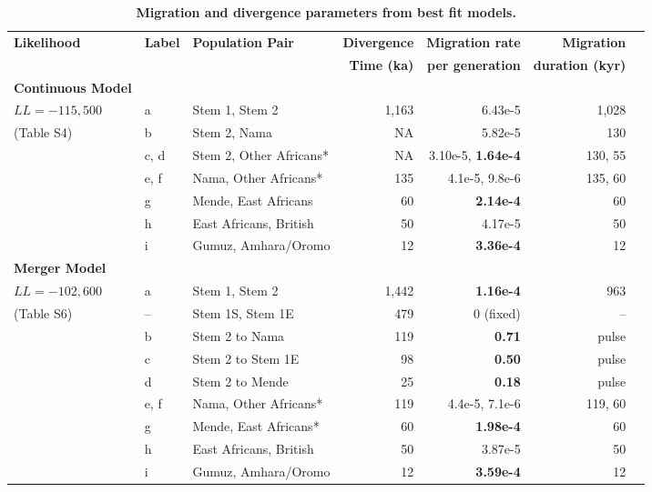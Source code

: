 \documentclass[]{article}
\begin{document}
\begin{table}[t!]
    \centering
    \scriptsize
    \begin{tabular}{lllrrrr}
        \toprule
        \textbf{Likelihood} & \textbf{Label} & \textbf{Population Pair} &
            \textbf{Divergence} & \textbf{Migration rate} & \textbf{Migration} \\
        & & & 
            \textbf{Time (ka)} & \textbf{per generation} & \textbf{duration (kyr)} \\
        \midrule
        \textbf{Continuous Model} & & & & & \\
        $LL= -115,500$ & a & Stem 1, Stem 2 & 1,163 & 6.43e-5 & 1,028 \\
        (Table S4) & b & Stem 2, Nama & NA & 5.82e-5 & 130 \\
        & c, d & Stem 2, Other Africans* & NA & 3.10e-5, \textbf{1.64e-4} & 130, 55 \\
        & e, f & Nama, Other Africans* & 135 & 4.1e-5, 9.8e-6 & 135, 60 \\
        & g & Mende, East Africans & 60 & \textbf{2.14e-4} & 60 \\
        & h & East Africans, British & 50 & 4.17e-5 & 50 \\
        & i & Gumuz, Amhara/Oromo & 12 &\textbf{3.36e-4} & 12 \\
        \textbf{Merger Model} & & & & & \\
        $LL= -102,600$ & a & Stem 1, Stem 2 & 1,442 & \textbf{1.16e-4} & 963 \\
        (Table S6) & -- & Stem 1S, Stem 1E & 479 & 0 (fixed) & -- \\
        & b & Stem 2 to Nama & 119 & \textbf{0.71} & pulse \\
        & c & Stem 2 to Stem 1E & 98 & \textbf{0.50} & pulse \\
        & d & Stem 2 to Mende & 25 & \textbf{0.18} & pulse \\
        & e, f & Nama, Other Africans* & 119 & 4.4e-5, 7.1e-6 & 119, 60 \\
        & g & Mende, East Africans* & 60 & \textbf{1.98e-4} & 60 \\
        & h & East Africans, British & 50 & 3.87e-5 & 50 \\
        & i & Gumuz, Amhara/Oromo &12 & \textbf{3.59e-4} & 12 \\
        \bottomrule
    \end{tabular}
    \caption{
        \textbf{Migration and divergence parameters from best fit models.}
}
\end{table}
\end{document}
